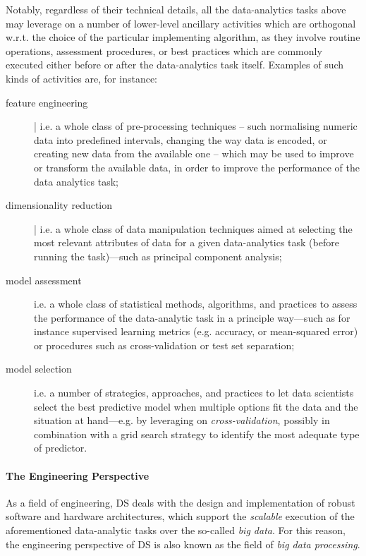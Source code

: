 \documentclass[12pt,a4paper,openright,twoside]{book}
\begin{document}
Notably, regardless of their technical details, all the data-analytics tasks above may leverage on a number of lower-level ancillary activities which are orthogonal w.r.t. the choice of the particular implementing algorithm, as they involve routine operations, assessment procedures, or best practices which are commonly executed either before or after the data-analytics task itself.
%
Examples of such kinds of activities are, for instance:
%
\begin{description}
    \item[feature engineering] | i.e. a whole class of pre-processing techniques -- such normalising numeric data into predefined intervals, changing the way data is encoded, or creating new data from the available one -- which may be used to improve or transform the available data, in order to improve the performance of the data analytics task;
    \item[dimensionality reduction] | i.e. a whole class of data manipulation techniques aimed at selecting the most relevant attributes of data for a given data-analytics task (before running the task)---such as principal component analysis;
    \item[model assessment] i.e. a whole class of statistical methods, algorithms, and practices to assess the performance of the data-analytic task in a principle way---such as for instance supervised learning metrics (e.g. accuracy, or mean-squared error) or procedures such as cross-validation or test set separation;
    \item[model selection] i.e. a number of strategies, approaches, and practices to let data scientists select the best predictive model when multiple options fit the data and the situation at hand---e.g. by leveraging on \emph{cross-validation}, possibly in combination with a grid search strategy to identify the most adequate type of predictor.
\end{description}
%
%

\paragraph{The Engineering Perspective}

As a field of engineering, DS deals with the design and implementation of robust software and hardware architectures, which support the \emph{scalable} execution of the aforementioned data-analytic tasks over the so-called \emph{big data}.
%
For this reason, the engineering perspective of DS is also known as the field of \emph{big data processing}.
\end{document}

